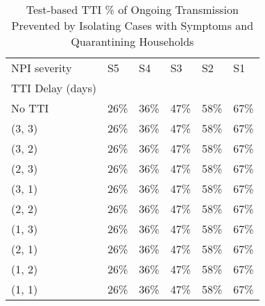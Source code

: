 \documentclass{article}
\begin{document}
    \begin{table}[H]
        \centering
         \begin{tabular}{llllll}
\toprule
NPI severity &    S5 &    S4 &    S3 &    S2 &    S1 \\
TTI Delay (days) &       &       &       &       &       \\
\midrule
No TTI           &  26\% &  36\% &  47\% &  58\% &  67\% \\
(3, 3)           &  26\% &  36\% &  47\% &  58\% &  67\% \\
(3, 2)           &  26\% &  36\% &  47\% &  58\% &  67\% \\
(2, 3)           &  26\% &  36\% &  47\% &  58\% &  67\% \\
(3, 1)           &  26\% &  36\% &  47\% &  58\% &  67\% \\
(2, 2)           &  26\% &  36\% &  47\% &  58\% &  67\% \\
(1, 3)           &  26\% &  36\% &  47\% &  58\% &  67\% \\
(2, 1)           &  26\% &  36\% &  47\% &  58\% &  67\% \\
(1, 2)           &  26\% &  36\% &  47\% &  58\% &  67\% \\
(1, 1)           &  26\% &  36\% &  47\% &  58\% &  67\% \\
\bottomrule
\end{tabular}

        \caption{Test-based TTI \% of Ongoing Transmission Prevented by Isolating Cases with Symptoms and Quarantining Households}
    \end{table}
    
\end{document}
